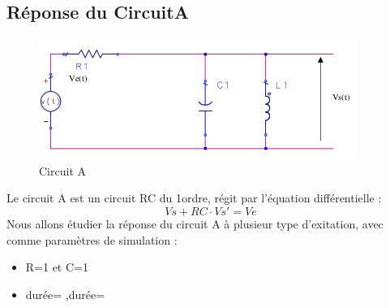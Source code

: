 \documentclass[a4paper,11pt]{article}
\begin{document}
\newpage


  \subsection{Réponse du CircuitA}
  \begin{figure}[H]
	 \begin{center}
	\includegraphics[scale=.7]{circuitTest}
	\caption{Circuit A}
	\end{center}
      \end{figure}
   Le circuit A est un circuit RC du 1\ier ordre, régit par l'équation différentielle :
   \begin{equation*}
    Vs+RC\cdot Vs'=Ve
   \end{equation*}
  Nous allons étudier la réponse du circuit A à plusieur type d'exitation, avec comme paramètres de simulation :  \\
  \begin{itemize}
   \item R=1 et C=1
   \item durée= ,durée= 
  \end{itemize}
\end{document}
